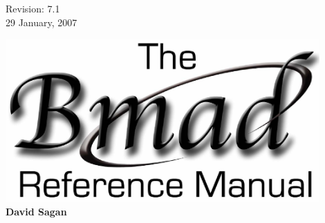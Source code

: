 \thispagestyle{empty}

\begin{flushright}
\large
  Revision: 7.1 \\
  29 January, 2007 \\
\end{flushright}

\vfill

{
\begin{center}
\includegraphics[width=12cm]{bmad_ref_manual.eps} \\
\vskip 0.3in
\huge\bf David Sagan
\end{center}
}

\vfill
\break
